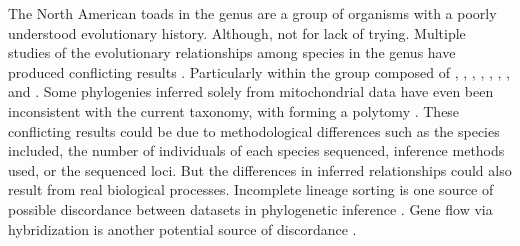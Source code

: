 The North American toads in the genus \anaxyrus are a group of organisms with a 
poorly understood evolutionary history. 
Although, not for lack of trying.
Multiple studies of the evolutionary relationships among species in the genus have produced
conflicting results \parencite{fontenot2011,graybeal1997,masta2002,pramuk2007,pyron2011,portik2023}.
Particularly within the \amer group composed of \amer, \baxteri, \fowl, 
\hemiophrys, \houstonensis, \microscaphus, \terr, and \wood.
Some phylogenies inferred solely from mitochondrial data have even been inconsistent
with the current taxonomy, with \fowl forming a polytomy \parencite{fontenot2011,masta2002}.
These conflicting results could be due to methodological differences such as
the species included, the number of individuals of each species sequenced, inference 
methods used, or the sequenced loci. 
But the differences in inferred relationships could also result from real
biological processes. 
Incomplete lineage sorting is one source of possible discordance between datasets 
in phylogenetic inference \parencite{kubatko2007}. 
Gene flow via hybridization is another potential source of discordance \parencite{degnan2009}. 





